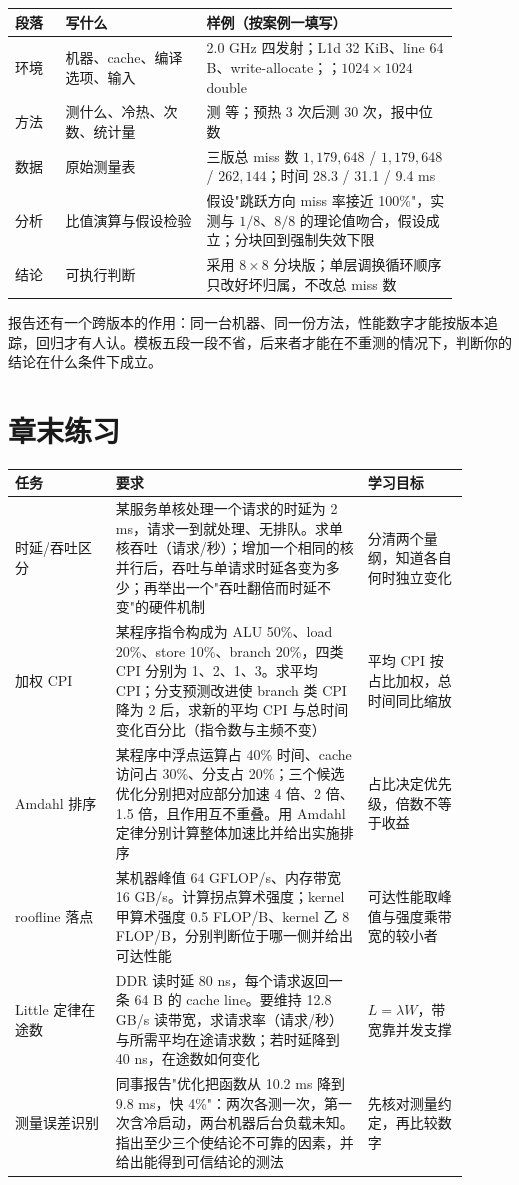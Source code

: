 \begin{longtable}{L{0.10\linewidth}L{0.28\linewidth}L{0.50\linewidth}}
\toprule
段落 & 写什么 & 样例（按案例一填写） \\
\midrule
环境 & 机器、cache、编译选项、输入 & 2.0 GHz 四发射；L1d 32 KiB、line 64 B、write-allocate；；$1024\times1024$ double \\
方法 & 测什么、冷热、次数、统计量 &  测  等；预热 3 次后测 30 次，报中位数 \\
数据 & 原始测量表 & 三版总 miss 数 $1{,}179{,}648$ / $1{,}179{,}648$ / $262{,}144$；时间 28.3 / 31.1 / 9.4 ms \\
分析 & 比值演算与假设检验 & 假设"跳跃方向 miss 率接近 100\%"，实测与 $1/8$、$8/8$ 的理论值吻合，假设成立；分块回到强制失效下限 \\
结论 & 可执行判断 & 采用 $8\times8$ 分块版；单层调换循环顺序只改好坏归属，不改总 miss 数 \\
\bottomrule
\end{longtable}

报告还有一个跨版本的作用：同一台机器、同一份方法，性能数字才能按版本追踪，回归才有人认。模板五段一段不省，后来者才能在不重测的情况下，判断你的结论在什么条件下成立。

\section*{章末练习}

\begin{longtable}{L{0.2\linewidth}L{0.5\linewidth}L{0.2\linewidth}}
\toprule
任务 & 要求 & 学习目标 \\
\midrule
时延/吞吐区分 & 某服务单核处理一个请求的时延为 2 ms，请求一到就处理、无排队。求单核吞吐（请求/秒）；增加一个相同的核并行后，吞吐与单请求时延各变为多少；再举出一个"吞吐翻倍而时延不变"的硬件机制 & 分清两个量纲，知道各自何时独立变化 \\
加权 CPI & 某程序指令构成为 ALU 50\%、load 20\%、store 10\%、branch 20\%，四类 CPI 分别为 1、2、1、3。求平均 CPI；分支预测改进使 branch 类 CPI 降为 2 后，求新的平均 CPI 与总时间变化百分比（指令数与主频不变） & 平均 CPI 按占比加权，总时间同比缩放 \\
Amdahl 排序 & 某程序中浮点运算占 40\% 时间、cache 访问占 30\%、分支占 20\%；三个候选优化分别把对应部分加速 4 倍、2 倍、1.5 倍，且作用互不重叠。用 Amdahl 定律分别计算整体加速比并给出实施排序 & 占比决定优先级，倍数不等于收益 \\
roofline 落点 & 某机器峰值 64 GFLOP/s、内存带宽 16 GB/s。计算拐点算术强度；kernel 甲算术强度 0.5 FLOP/B、kernel 乙 8 FLOP/B，分别判断位于哪一侧并给出可达性能 & 可达性能取峰值与强度乘带宽的较小者 \\
Little 定律在途数 & DDR 读时延 80 ns，每个请求返回一条 64 B 的 cache line。要维持 12.8 GB/s 读带宽，求请求率（请求/秒）与所需平均在途请求数；若时延降到 40 ns，在途数如何变化 & $L=\lambda W$，带宽靠并发支撑 \\
测量误差识别 & 同事报告"优化把函数从 10.2 ms 降到 9.8 ms，快 4\%"：两次各测一次，第一次含冷启动，两台机器后台负载未知。指出至少三个使结论不可靠的因素，并给出能得到可信结论的测法 & 先核对测量约定，再比较数字 \\
\bottomrule
\end{longtable}

